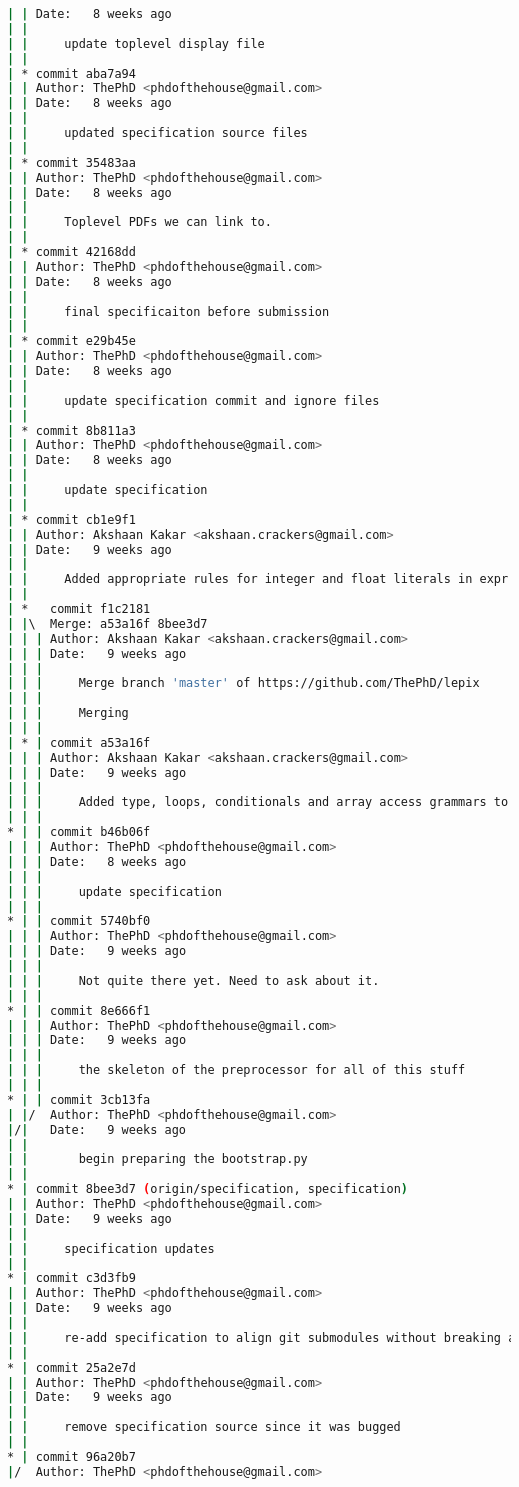\begin{lstlisting}[language=bash]
| | Date:   8 weeks ago
| | 
| |     update toplevel display file
| |   
| * commit aba7a94
| | Author: ThePhD <phdofthehouse@gmail.com>
| | Date:   8 weeks ago
| | 
| |     updated specification source files
| |   
| * commit 35483aa
| | Author: ThePhD <phdofthehouse@gmail.com>
| | Date:   8 weeks ago
| | 
| |     Toplevel PDFs we can link to.
| |   
| * commit 42168dd
| | Author: ThePhD <phdofthehouse@gmail.com>
| | Date:   8 weeks ago
| | 
| |     final specificaiton before submission
| |   
| * commit e29b45e
| | Author: ThePhD <phdofthehouse@gmail.com>
| | Date:   8 weeks ago
| | 
| |     update specification commit and ignore files
| |   
| * commit 8b811a3
| | Author: ThePhD <phdofthehouse@gmail.com>
| | Date:   8 weeks ago
| | 
| |     update specification
| |   
| * commit cb1e9f1
| | Author: Akshaan Kakar <akshaan.crackers@gmail.com>
| | Date:   9 weeks ago
| | 
| |     Added appropriate rules for integer and float literals in expr grammar in parser.mly
| |     
| *   commit f1c2181
| |\  Merge: a53a16f 8bee3d7
| | | Author: Akshaan Kakar <akshaan.crackers@gmail.com>
| | | Date:   9 weeks ago
| | | 
| | |     Merge branch 'master' of https://github.com/ThePhD/lepix
| | |     
| | |     Merging
| | |    
| * | commit a53a16f
| | | Author: Akshaan Kakar <akshaan.crackers@gmail.com>
| | | Date:   9 weeks ago
| | | 
| | |     Added type, loops, conditionals and array access grammars to parser
| | |    
* | | commit b46b06f
| | | Author: ThePhD <phdofthehouse@gmail.com>
| | | Date:   8 weeks ago
| | | 
| | |     update specification
| | |    
* | | commit 5740bf0
| | | Author: ThePhD <phdofthehouse@gmail.com>
| | | Date:   9 weeks ago
| | | 
| | |     Not quite there yet. Need to ask about it.
| | |    
* | | commit 8e666f1
| | | Author: ThePhD <phdofthehouse@gmail.com>
| | | Date:   9 weeks ago
| | | 
| | |     the skeleton of the preprocessor for all of this stuff
| | |    
* | | commit 3cb13fa
| |/  Author: ThePhD <phdofthehouse@gmail.com>
|/|   Date:   9 weeks ago
| |   
| |       begin preparing the bootstrap.py
| |   
* | commit 8bee3d7 (origin/specification, specification)
| | Author: ThePhD <phdofthehouse@gmail.com>
| | Date:   9 weeks ago
| | 
| |     specification updates
| |   
* | commit c3d3fb9
| | Author: ThePhD <phdofthehouse@gmail.com>
| | Date:   9 weeks ago
| | 
| |     re-add specification to align git submodules without breaking anything
| |   
* | commit 25a2e7d
| | Author: ThePhD <phdofthehouse@gmail.com>
| | Date:   9 weeks ago
| | 
| |     remove specification source since it was bugged
| |   
* | commit 96a20b7
|/  Author: ThePhD <phdofthehouse@gmail.com>

\end{lstlisting}
